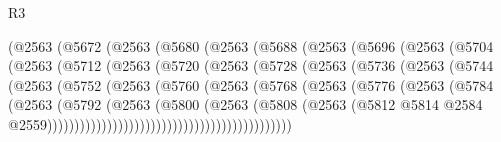 \begin{lexlean}{R3}
\begin{coremodule}
                  (@2563
                    (@5672
                      (@2563
                        (@5680
                          (@2563
                            (@5688
                              (@2563
                                (@5696
                                  (@2563
                                    (@5704
                                      (@2563
                                        (@5712
                                          (@2563
                                            (@5720
                                              (@2563
                                                (@5728
                                                  (@2563
                                                    (@5736
                                                      (@2563
                                                        (@5744
                                                          (@2563
                                                            (@5752
                                                              (@2563
                                                                (@5760
                                                                  (@2563
                                                                    (@5768
                                                                      (@2563
                                                                        (@5776
                                                                          (@2563
                                                                            (@5784
                                                                              (@2563
                                                                                (@5792
                                                                                  (@2563
                                                                                    (@5800
                                                                                      (@2563
                                                                                        (@5808
                                                                                          (@2563
                                                                                            (@5812
                                                                                              @5814
                                                                                              @2584
                                                                                              @2559)))))))))))))))))))))))))))))))))))))))))))))

\end{coremodule}
\end{lexlean}
